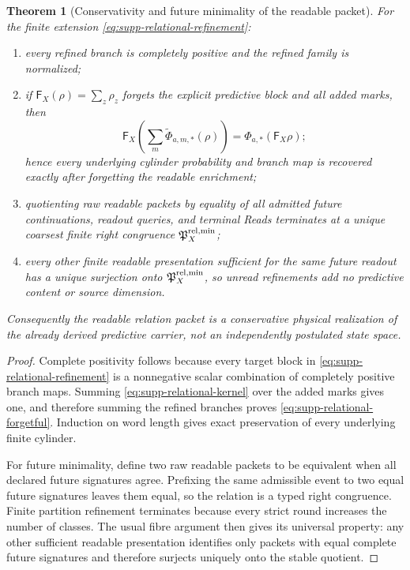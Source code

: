 \documentclass[11pt]{article}
\newtheorem{theorem}{Theorem}[section]
\theoremstyle{definition}
\theoremstyle{remark}
\begin{document}
\begin{theorem}[Conservativity and future minimality of the readable packet]
\label{thm:supp-readable-relational-completion}
For the finite extension \eqref{eq:supp-relational-refinement}:
\begin{enumerate}[label=\textup{(C\arabic*)},leftmargin=3em]
\item every refined branch is completely positive and the refined family is
      normalized;
\item if $\mathsf F_X(\rho)=\sum_z\rho_z$ forgets the explicit predictive block
      and all added marks, then
      \begin{equation}
       \boxed{
       \mathsf F_X\!\left(\sum_m\widetilde\Phi_{a,m,*}(\rho)\right)
       =\Phi_{a,*}(\mathsf F_X\rho);}
       \label{eq:supp-relational-forgetful}
      \end{equation}
      hence every underlying cylinder probability and branch map is recovered
      exactly after forgetting the readable enrichment;
\item quotienting raw readable packets by equality of all admitted future
      continuations, readout queries, and terminal Reads terminates at a unique
      coarsest finite right congruence $\mathfrak P_X^{\rm rel,min}$;
\item every other finite readable presentation sufficient for the same future
      readout has a unique surjection onto
      $\mathfrak P_X^{\rm rel,min}$, so unread refinements add no predictive
      content or source dimension.
\end{enumerate}
Consequently the readable relation packet is a conservative physical
realization of the already derived predictive carrier, not an independently
postulated state space.
\end{theorem}

\begin{proof}
Complete positivity follows because every target block in
\eqref{eq:supp-relational-refinement} is a nonnegative scalar combination of
completely positive branch maps.  Summing
\eqref{eq:supp-relational-kernel} over the added marks gives one, and therefore
summing the refined branches proves
\eqref{eq:supp-relational-forgetful}.  Induction on word length gives exact
preservation of every underlying finite cylinder.

For future minimality, define two raw readable packets to be equivalent when
all declared future signatures agree.  Prefixing the same admissible event to
two equal future signatures leaves them equal, so the relation is a typed
right congruence.  Finite partition refinement terminates because every strict
round increases the number of classes.  The usual fibre argument then gives
its universal property: any other sufficient readable presentation identifies
only packets with equal complete future signatures and therefore surjects
uniquely onto the stable quotient.
\end{proof}
\end{document}
